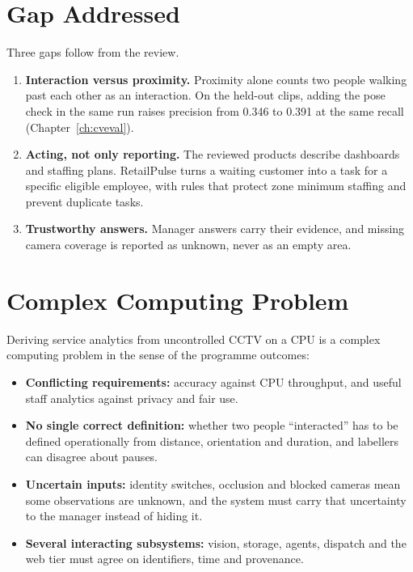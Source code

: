 \section{Gap Addressed}
Three gaps follow from the review.
\begin{enumerate}
\item \textbf{Interaction versus proximity.} Proximity alone counts two people walking past each other as an interaction. On the held-out clips, adding the pose check in the same run raises precision from 0.346 to 0.391 at the same recall (Chapter~\ref{ch:cveval}).
\item \textbf{Acting, not only reporting.} The reviewed products describe dashboards and staffing plans. RetailPulse turns a waiting customer into a task for a specific eligible employee, with rules that protect zone minimum staffing and prevent duplicate tasks.
\item \textbf{Trustworthy answers.} Manager answers carry their evidence, and missing camera coverage is reported as unknown, never as an empty area.
\end{enumerate}

\section{Complex Computing Problem}
Deriving service analytics from uncontrolled CCTV on a CPU is a complex computing problem in the sense of the programme outcomes:
\begin{itemize}
\item \textbf{Conflicting requirements:} accuracy against CPU throughput, and useful staff analytics against privacy and fair use.
\item \textbf{No single correct definition:} whether two people ``interacted'' has to be defined operationally from distance, orientation and duration, and labellers can disagree about pauses.
\item \textbf{Uncertain inputs:} identity switches, occlusion and blocked cameras mean some observations are unknown, and the system must carry that uncertainty to the manager instead of hiding it.
\item \textbf{Several interacting subsystems:} vision, storage, agents, dispatch and the web tier must agree on identifiers, time and provenance.
\end{itemize}
